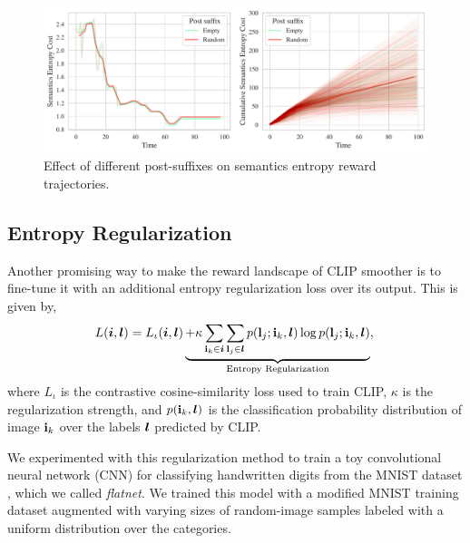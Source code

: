 \begin{figure}[H]
    \centering
    \includegraphics[width=\textwidth]{images/post_suffix_comparison.pdf}
    \caption{Effect of different post-suffixes on semantics entropy reward trajectories.}
    \label{fig:post-suffix}
\end{figure}


\subsection{Entropy Regularization}
\label{sec:entropy-regularization}
Another promising way to make the reward landscape of CLIP smoother is to fine-tune it with an additional entropy regularization loss over its output.
This is given by,
\begin{equation}
    \label{eq:entropy-regularization}
    L(\bm{i}, \bm{l}) = L_{\iota}(\bm{i}, \bm{l}) \underbrace{+ \kappa \sum_{\mathbf{i}_k \in \bm{i}}\sum_{\mathbf{l}_j \in \bm{l}} p(\mathbf{l}_j; \mathbf{i}_k, \bm{l}) \log p(\mathbf{l}_j; \mathbf{i}_k, \bm{l})}_{\text{Entropy Regularization}},\\
\end{equation}
where \(L_{\iota}\) is the contrastive cosine-similarity loss used to train CLIP, $\kappa$ is the regularization strength, and \(p(\mathbf{i}_k, \bm{l})\) is the classification probability distribution of image \(\mathbf{i}_k\) over the labels \(\bm{l}\) predicted by CLIP.

We experimented with this regularization method to train a toy convolutional neural network (CNN) for classifying handwritten digits from the MNIST dataset \citep{mnist}, which we called \emph{flatnet}.
We trained this model with a modified MNIST training dataset augmented with varying sizes of random-image samples labeled with a uniform distribution over the categories.

